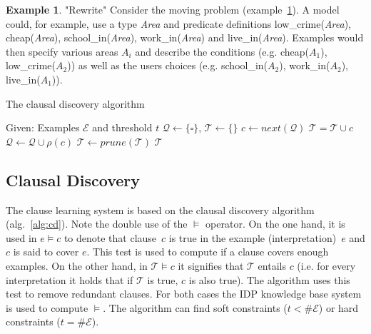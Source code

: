 \documentclass[letterpaper]{article}
\newcommand{\sym}[1]{\ensuremath{\mathcal{#1}}}
\theoremstyle{definition}
\newtheorem{example}{Example}
\begin{document}
\begin{example} "Rewrite"
  \label{ex:moving-input}
  Consider the moving problem (example~\ref{ex:moving-input}).
  A model could, for example, use a type \textit{Area} and predicate definitions low\_crime(\textit{Area}), cheap(\textit{Area}), school\_in(\textit{Area}), work\_in(\textit{Area}) and live\_in(\textit{Area}).
  Examples would then specify various areas $A_i$ and describe the conditions (e.g. cheap($A_1$), low\_crime($A_2$)) as well as the users choices (e.g. school\_in($A_2$), work\_in($A_2$), live\_in($A_1$)).
\end{example}

\begin{algorithm}
  \caption{The clausal discovery algorithm}
  \label{alg:cd}

  \begin{algorithmic}
  \State Given: Examples \sym{E} and threshold $t$
  \State $\sym{Q} \gets \{\square\}$, $\sym{T} \gets \{\}$
  \While{$\#\sym{Q} > 0$}
    \State $c \gets next(\sym{Q})$
    \If{$\#\{e \in \sym{E} | e \models c\} \geq t$}
      \If{$\lnot (\sym{T} \models c)$}
        \State $\sym{T} = \sym{T} \cup c$
      \EndIf
    \Else
      \State $\sym{Q} \gets \sym{Q} \cup \rho(c)$
    \EndIf
  \EndWhile
  \State $\sym{T} \gets prune(\sym{T})$
  \State \Return \sym{T}
  \end{algorithmic}
\end{algorithm}

\subsection{Clausal Discovery}
The clause learning system is based on the clausal discovery algorithm (alg.~\ref{alg:cd}).
Note the double use of the $\models$ operator.
On the one hand, it is used in $e \models c$ to denote that clause~$c$ is true in the example (interpretation)~$e$ and $c$ is said to cover $e$.
This test is used to compute if a clause covers enough examples.
On the other hand, in $\sym{T} \models c$ it signifies that \sym{T} entails $c$ (i.e. for every interpretation it holds that if \sym{T} is true, $c$ is also true).
The algorithm uses this test to remove redundant clauses.
For both cases the IDP knowledge base system \cite{de2013prototype,wittocx2008idp} is used to compute $\models$.
The algorithm can find soft constraints ($t < \# \sym{E}$) or hard constraints ($t = \# \sym{E}$).
\end{document}
